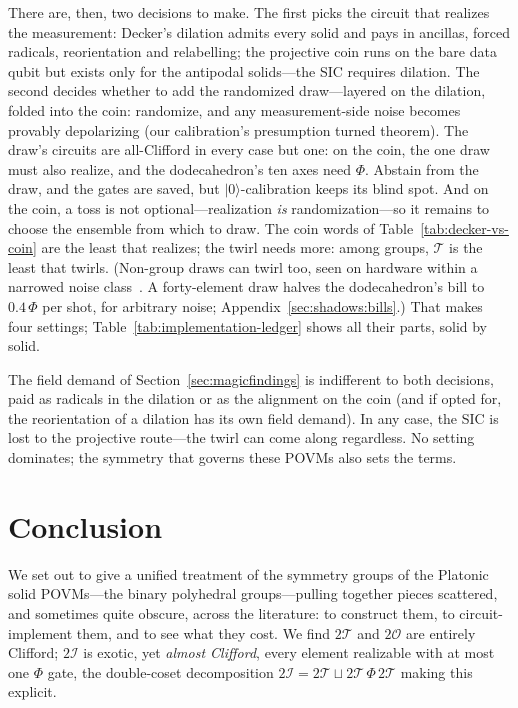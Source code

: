 \documentclass[11pt, oneside, openany]{scrbook}
\newcommand{\Tgroup}{\mathcal{T}}  %
\newcommand{\Ogroup}{\mathcal{O}}  %
\newcommand{\Igroup}{\mathcal{I}}  %
\newcommand{\TwoT}{2\Tgroup}
\newcommand{\TwoO}{2\Ogroup}
\newcommand{\TwoI}{2\Igroup}
\newcommand{\ket}[1]{|#1\rangle}
\begin{document}
There are, then, two decisions to make. The first picks the circuit that realizes the measurement: Decker's dilation admits every solid and pays in ancillas, forced radicals, reorientation and relabelling; the projective coin runs on the bare data qubit but exists only for the antipodal solids---the SIC requires dilation. The second decides whether to add the randomized draw---layered on the dilation, folded into the coin: randomize, and any measurement-side noise becomes provably depolarizing (our calibration's presumption turned theorem). The draw's circuits are all-Clifford in every case but one: on the coin, the one draw must also realize, and the dodecahedron's ten axes need $\Phi$. Abstain from the draw, and the gates are saved, but $\ket{0}$-calibration keeps its blind spot. And on the coin, a toss is not optional---realization \textit{is} randomization---so it remains to choose the ensemble from which to draw. The coin words of Table~\ref{tab:decker-vs-coin} are the least that realizes; the twirl needs more: among groups, $\Tgroup$ is the least that twirls. (Non-group draws can twirl too, seen on hardware within a narrowed noise class~\cite{wilkens2026localrobustshadowsa}. A forty-element draw halves the dodecahedron's bill to $0.4\,\Phi$ per shot, for arbitrary noise; Appendix~\ref{sec:shadows:bills}.) That makes four settings; Table~\ref{tab:implementation-ledger} shows all their parts, solid by solid.

The field demand of Section~\ref{sec:magicfindings} is indifferent to both decisions, paid as radicals in the dilation or as the alignment on the coin (and if opted for, the reorientation of a dilation has its own field demand). In any case, the SIC is lost to the projective route---the twirl can come along regardless. No setting dominates; the symmetry that governs these POVMs also sets the terms.

\chapter{Conclusion} \label{cha:conclusion}


We set out to give a unified treatment of the symmetry groups of the Platonic solid POVMs---the binary polyhedral groups---pulling together pieces scattered, and sometimes quite obscure, across the literature: to construct them, to circuit-implement them, and to see what they cost. We find $\TwoT$ and $\TwoO$ are entirely Clifford; $\TwoI$ is exotic, yet \textit{almost Clifford}, every element realizable with at most one $\Phi$ gate, the double-coset decomposition $\TwoI = \TwoT \sqcup \TwoT\,\Phi\,\TwoT$ making this explicit.
\end{document}
